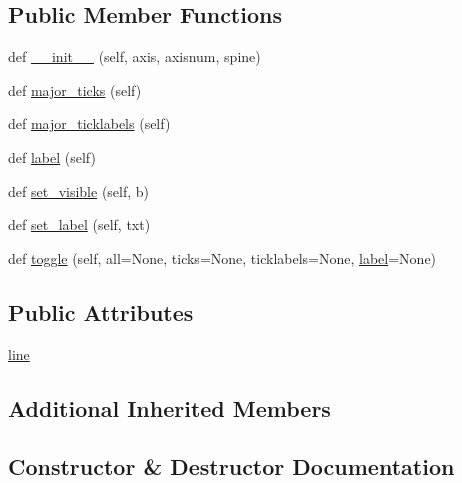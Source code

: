 \subsection*{Public Member Functions}
\begin{DoxyCompactItemize}
\item 
def \hyperlink{classaxes__grid1_1_1mpl__axes_1_1SimpleAxisArtist_a9eaaab65352380ee3b9aacea0038a476}{\+\_\+\+\_\+init\+\_\+\+\_\+} (self, axis, axisnum, spine)
\item 
def \hyperlink{classaxes__grid1_1_1mpl__axes_1_1SimpleAxisArtist_a94ce02b63ba83dba2ec597d71de0413c}{major\+\_\+ticks} (self)
\item 
def \hyperlink{classaxes__grid1_1_1mpl__axes_1_1SimpleAxisArtist_ac28207fee4e83df86fd557dbd980d801}{major\+\_\+ticklabels} (self)
\item 
def \hyperlink{classaxes__grid1_1_1mpl__axes_1_1SimpleAxisArtist_a2df3ca76949e39667b4b7754c3999dca}{label} (self)
\item 
def \hyperlink{classaxes__grid1_1_1mpl__axes_1_1SimpleAxisArtist_ab9f7dc11a49afaca3689acf96022cb60}{set\+\_\+visible} (self, b)
\item 
def \hyperlink{classaxes__grid1_1_1mpl__axes_1_1SimpleAxisArtist_aaad84ddb1e9703f53009f8172c5368f6}{set\+\_\+label} (self, txt)
\item 
def \hyperlink{classaxes__grid1_1_1mpl__axes_1_1SimpleAxisArtist_afbfcb29f48a819033cd72142918b57e2}{toggle} (self, all=None, ticks=None, ticklabels=None, \hyperlink{classaxes__grid1_1_1mpl__axes_1_1SimpleAxisArtist_a2df3ca76949e39667b4b7754c3999dca}{label}=None)
\end{DoxyCompactItemize}
\subsection*{Public Attributes}
\begin{DoxyCompactItemize}
\item 
\hyperlink{classaxes__grid1_1_1mpl__axes_1_1SimpleAxisArtist_ae90f860cbc472acfc4d5ac6773e8c2bf}{line}
\end{DoxyCompactItemize}
\subsection*{Additional Inherited Members}


\subsection{Constructor \& Destructor Documentation}
\mbox{\label{classaxes__grid1_1_1mpl__axes_1_1SimpleAxisArtist_a9eaaab65352380ee3b9aacea0038a476}} 
